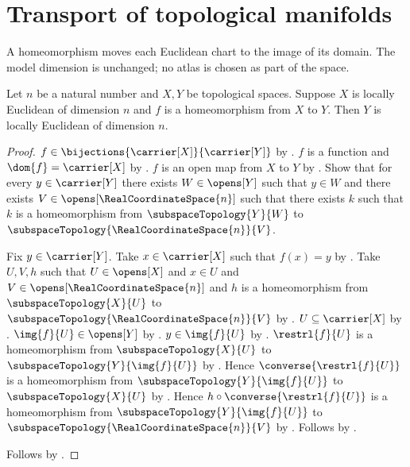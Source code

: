 \section{Transport of topological manifolds}






A homeomorphism moves each Euclidean chart to the image of its domain.
The model dimension is unchanged; no atlas is chosen as part of the space.

\begin{theorem}\label{homeomorphism_preserves_locally_euclidean}
    Let $n$ be a natural number and $X,Y$ be topological spaces.
    Suppose $X$ is locally Euclidean of dimension $n$ and
        $f$ is a homeomorphism from $X$ to $Y$.
    Then $Y$ is locally Euclidean of dimension $n$.
\end{theorem}
\begin{proof}
    $f\in\bijections{\carrier[X]}{\carrier[Y]}$ by .
    $f$ is a function and $\dom{f}=\carrier[X]$ by .
    $f$ is an open map from $X$ to $Y$ by .
    Show that for every $y\in\carrier[Y]$ there exists $W\in\opens[Y]$ such that
        $y\in W$ and there exists $V\in\opens[\RealCoordinateSpace{n}]$ such that
        there exists $k$ such that $k$ is a homeomorphism from $\subspaceTopology{Y}{W}$ to
            $\subspaceTopology{\RealCoordinateSpace{n}}{V}$.
    \begin{subproof}
        Fix $y\in\carrier[Y]$.
        Take $x\in\carrier[X]$ such that $f(x)=y$ by .
        Take $U,V,h$ such that $U\in\opens[X]$ and $x\in U$ and
            $V\in\opens[\RealCoordinateSpace{n}]$ and $h$ is a homeomorphism from
            $\subspaceTopology{X}{U}$ to $\subspaceTopology{\RealCoordinateSpace{n}}{V}$ by
            .
        $U\subseteq\carrier[X]$ by .
        $\img{f}{U}\in\opens[Y]$ by .
        $y\in\img{f}{U}$ by .
        $\restrl{f}{U}$ is a homeomorphism from $\subspaceTopology{X}{U}$ to
            $\subspaceTopology{Y}{\img{f}{U}}$ by .
        Hence $\converse{\restrl{f}{U}}$ is a homeomorphism from
            $\subspaceTopology{Y}{\img{f}{U}}$ to $\subspaceTopology{X}{U}$ by
            .
        Hence $h\circ\converse{\restrl{f}{U}}$ is a homeomorphism from
            $\subspaceTopology{Y}{\img{f}{U}}$ to $\subspaceTopology{\RealCoordinateSpace{n}}{V}$ by
            .
        Follows by .
    \end{subproof}
    Follows by .
\end{proof}

